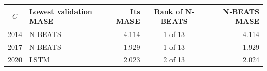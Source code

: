 \begin{tabular}{@{}clrcr@{}}
\toprule
$C$ & Lowest validation MASE & Its MASE & Rank of N-BEATS & N-BEATS MASE \\
\midrule
2014 & N-BEATS & 4.114 & 1 of 13 & 4.114 \\
2017 & N-BEATS & 1.929 & 1 of 13 & 1.929 \\
2020 & LSTM & 2.023 & 2 of 13 & 2.024 \\
\bottomrule
\end{tabular}
